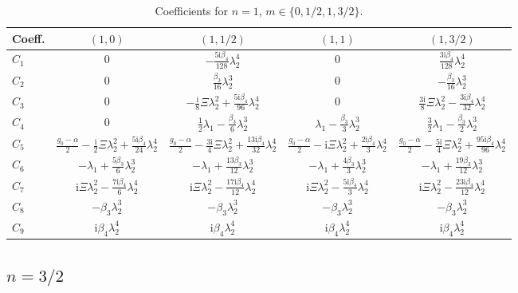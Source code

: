 \documentclass[11pt]{article}
\newcommand{\ii}{\mathrm{i}}
\begin{document}
\begin{table}[htbp]
\centering\small
\caption{Coefficients for $n=1$, $m\in\{0,1/2,1,3/2\}$.}
\label{tab:n1-0113}
\begin{tabular}{lcccc}
\toprule
Coeff. & $(1,0)$ & $(1,1/2)$ & $(1,1)$ & $(1,3/2)$ \\
\midrule
$C_1$ & $0$ & $-\tfrac{5\ii\beta_4}{128}\lambda_2^4$ & $0$ & $\tfrac{3\ii\beta_4}{128}\lambda_2^4$ \\
$C_2$ & $0$ & $\tfrac{\beta_3}{16}\lambda_2^3$ & $0$ & $-\tfrac{\beta_3}{16}\lambda_2^3$ \\
$C_3$ & $0$ & $-\tfrac{\ii}{8}\Xi\lambda_2^2+\tfrac{5\ii\beta_4}{96}\lambda_2^4$ & $0$ & $\tfrac{3\ii}{8}\Xi\lambda_2^2-\tfrac{3\ii\beta_4}{32}\lambda_2^4$ \\
$C_4$ & $0$ & $\tfrac12\lambda_1-\tfrac{\beta_3}{6}\lambda_2^3$ & $\lambda_1-\tfrac{\beta_3}{3}\lambda_2^3$ & $\tfrac32\lambda_1-\tfrac{\beta_3}{2}\lambda_2^3$ \\
$C_5$ & $\tfrac{g_0-\alpha}{2}-\tfrac{\ii}{2}\Xi\lambda_2^2+\tfrac{5\ii\beta_4}{24}\lambda_2^4$ & $\tfrac{g_0-\alpha}{2}-\tfrac{3\ii}{4}\Xi\lambda_2^2+\tfrac{13\ii\beta_4}{32}\lambda_2^4$ & $\tfrac{g_0-\alpha}{2}-\ii\Xi\lambda_2^2+\tfrac{2\ii\beta_4}{3}\lambda_2^4$ & $\tfrac{g_0-\alpha}{2}-\tfrac{5\ii}{4}\Xi\lambda_2^2+\tfrac{95\ii\beta_4}{96}\lambda_2^4$ \\
$C_6$ & $-\lambda_1+\tfrac{5\beta_3}{6}\lambda_2^3$ & $-\lambda_1+\tfrac{13\beta_3}{12}\lambda_2^3$ & $-\lambda_1+\tfrac{4\beta_3}{3}\lambda_2^3$ & $-\lambda_1+\tfrac{19\beta_3}{12}\lambda_2^3$ \\
$C_7$ & $\ii\Xi\lambda_2^2-\tfrac{7\ii\beta_4}{6}\lambda_2^4$ & $\ii\Xi\lambda_2^2-\tfrac{17\ii\beta_4}{12}\lambda_2^4$ & $\ii\Xi\lambda_2^2-\tfrac{5\ii\beta_4}{3}\lambda_2^4$ & $\ii\Xi\lambda_2^2-\tfrac{23\ii\beta_4}{12}\lambda_2^4$ \\
$C_8$ & $-\beta_3\lambda_2^3$ & $-\beta_3\lambda_2^3$ & $-\beta_3\lambda_2^3$ & $-\beta_3\lambda_2^3$ \\
$C_9$ & $\ii\beta_4\lambda_2^4$ & $\ii\beta_4\lambda_2^4$ & $\ii\beta_4\lambda_2^4$ & $\ii\beta_4\lambda_2^4$ \\
\bottomrule
\end{tabular}
\end{table}

\subsection{$n=3/2$}
\end{document}
